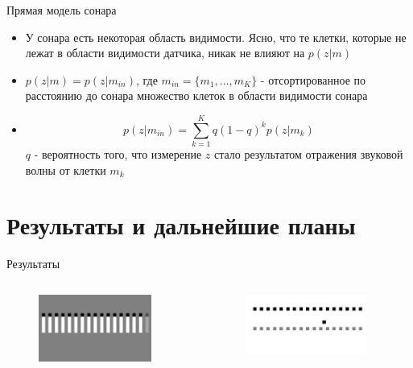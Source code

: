 \documentclass[9pt]{beamer}
\begin{document}
\begin{frame}{Прямая модель сонара}
\begin{itemize}
  \item
  {
    У сонара есть некоторая область видимости. Ясно, что те клетки, которые не лежат в области видимости датчика, никак не влияют на $p(z|m)$
  }
  \item
  {
    $p(z|m) = p(z|m_{in})$, где $m_{in} = \{ m_1, ..., m_K\}$ - отсортированное по расстоянию до сонара множество клеток в области видимости сонара
  }
  \item
  {
    $$p(z|m_{in}) = \sum_{k=1}^K{q (1-q)^k p(z|m_{k})}$$
    $q$ - вероятность того, что измерение $z$ стало результатом отражения звуковой волны от клетки $m_{k}$
  }
\end{itemize}
\end{frame}



\section{Результаты и дальнейшие планы}
\begin{frame}{Результаты}
\begin{columns}
\begin{column}{0.5\textwidth}
  
  \begin{figure}[h]
    \centering
    \includegraphics[width=0.9\textwidth]{inv_line_ex.png}
  \end{figure}

\end{column}
\begin{column}{0.5\textwidth}
  \begin{figure}[h]
    \centering
    \includegraphics[width=0.9\textwidth]{line_ex.png}
  \end{figure}
\end{column}
\end{columns}
\end{frame}
\end{document}
